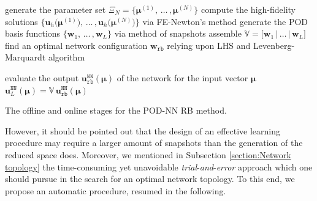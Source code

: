 \documentclass{elsarticle}
\numberwithin{equation}{section}
\theoremstyle{theorem}
\theoremstyle{definition}
\theoremstyle{remark}
\theoremstyle{proposition}
\numberwithin{figure}{section}
\newcommand{\bg}[1]{\boldsymbol{#1}}
\begin{document}
		\begin{algorithm}[b!]	
			\begin{algorithmic}[1]
					\State generate the parameter set $\Xi_N = \big\lbrace \bg{\mu}^{(1)}, \, \ldots \, , \bg{\mu}^{(N)} \big\rbrace$
					\State compute the high-fidelity solutions $\big\lbrace \mathbf{u}_h \big( \bg{\mu}^{(1)} \big), \, \ldots \, , \mathbf{u}_h \big( \bg{\mu}^{(N)} \big) \big\rbrace$ via FE-Newton's method
					\State generate the POD basis functions $\big\lbrace \mathbf{w}_1, \, \ldots \, , \mathbf{w}_L \big\rbrace$ via method of snapshots
					\State assemble $\mathbb{V} = \big[ \mathbf{w}_1 \, \big| \, \ldots \, \big| \, \mathbf{w}_L \big]$
					\State find an optimal network configuration $\mathbf{w}_{\texttt{rb}}$ relying upon LHS and Levenberg-Marquardt algorithm
				\EndFunction
				
				\vspace*{0.3cm}
				
				\setcounter{ALG@line}{0}
				
				\Function{$\mathbf{u}_L^{\texttt{NN}} (\bg{\mu}) = $ \textsc{PODNN\_online}}{$\bg{\mu}$, $\mathbb{V}$, $\mathbf{w}_{\texttt{rb}}$}
					\State evaluate the output $\mathbf{u}_{\texttt{rb}}^{\texttt{NN}}(\bg{\mu})$ of the network for the input vector $\bg{\mu}$
					\State $\mathbf{u}_L^{\texttt{NN}} (\bg{\mu}) = \mathbb{V} \, \mathbf{u}_{\texttt{rb}}^{\texttt{NN}}(\bg{\mu})$
				\EndFunction
			\end{algorithmic}
			
			\caption{The offline and online stages for the POD-NN RB method.}
			\label{alg:pod-nn}
		\end{algorithm}
		
		\clearpage
		
		However, it should be pointed out that the design of an effective learning procedure may require a larger amount of snapshots than the generation of the reduced space does. Moreover, we mentioned in Subsection \ref{section:Network topology} the time-consuming yet unavoidable \emph{trial}-\emph{and}-\emph{error} approach which one should pursue in the search for an optimal network topology. To this end, we propose an automatic procedure, resumed in the following. %
		
\end{document}
